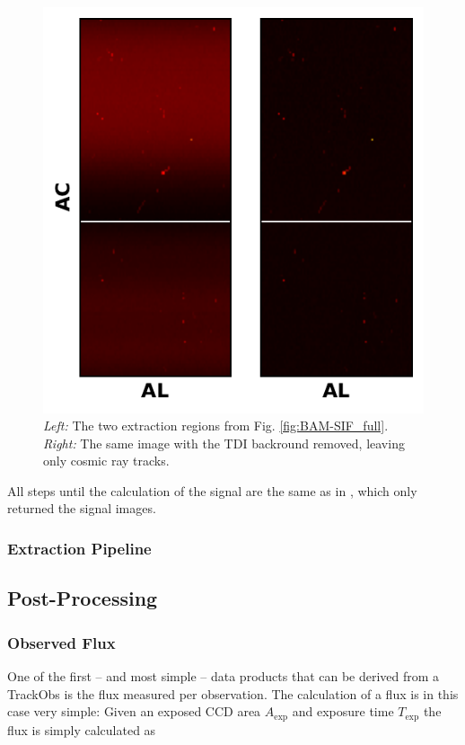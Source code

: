 \documentclass[a4paper, 11pt]{article}
\begin{document}
\begin{figure}
  \centering
  \includegraphics{images/BAM-SIF_background}
  \caption{\textit{Left:} The two extraction regions from Fig. \ref{fig:BAM-SIF_full}. \textit{Right:} The same image with the TDI backround removed, leaving only cosmic ray tracks.}
  \label{fig:BAM-SIF_background}
\end{figure}

All steps until the calculation of the signal are the same as in \cite{GAIA-DE-TN-ESAC-RKO-033}, which only returned the signal images.

\subsubsection{Extraction Pipeline}
\subsection{Post-Processing}

\subsubsection{Observed Flux}

One of the first -- and most simple -- data products that can be derived from a TrackObs is the flux measured per observation. The calculation of a flux is in this case very simple: Given an exposed CCD area $A_\mathrm{exp}$ and exposure time $T_\mathrm{exp}$ the flux is simply calculated as
\end{document}
